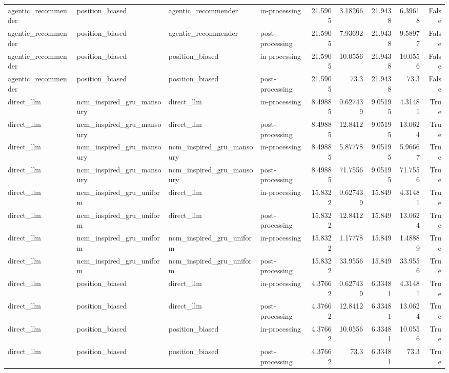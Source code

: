 \begin{table}[htbp!]
\begin{tabular}{llllrrrrr}
agentic\_recommender & position\_biased & agentic\_recommender & in-processing & 21.5905 & 3.18266 & 21.9438 & 6.39618 & False \\
agentic\_recommender & position\_biased & agentic\_recommender & post-processing & 21.5905 & 7.93692 & 21.9438 & 9.58977 & False \\
agentic\_recommender & position\_biased & position\_biased & in-processing & 21.5905 & 10.0556 & 21.9438 & 10.0556 & False \\
agentic\_recommender & position\_biased & position\_biased & post-processing & 21.5905 & 73.3 & 21.9438 & 73.3 & False \\
direct\_llm & ncm\_inspired\_gru\_mansoury & direct\_llm & in-processing & 8.49885 & 0.627439 & 9.05195 & 4.31481 & True \\
direct\_llm & ncm\_inspired\_gru\_mansoury & direct\_llm & post-processing & 8.49885 & 12.8412 & 9.05195 & 13.0624 & True \\
direct\_llm & ncm\_inspired\_gru\_mansoury & ncm\_inspired\_gru\_mansoury & in-processing & 8.49885 & 5.87778 & 9.05195 & 5.96667 & True \\
direct\_llm & ncm\_inspired\_gru\_mansoury & ncm\_inspired\_gru\_mansoury & post-processing & 8.49885 & 71.7556 & 9.05195 & 71.7556 & True \\
direct\_llm & ncm\_inspired\_gru\_uniform & direct\_llm & in-processing & 15.8322 & 0.627439 & 15.849 & 4.31481 & True \\
direct\_llm & ncm\_inspired\_gru\_uniform & direct\_llm & post-processing & 15.8322 & 12.8412 & 15.849 & 13.0624 & True \\
direct\_llm & ncm\_inspired\_gru\_uniform & ncm\_inspired\_gru\_uniform & in-processing & 15.8322 & 1.17778 & 15.849 & 1.48889 & True \\
direct\_llm & ncm\_inspired\_gru\_uniform & ncm\_inspired\_gru\_uniform & post-processing & 15.8322 & 33.9556 & 15.849 & 33.9556 & True \\
direct\_llm & position\_biased & direct\_llm & in-processing & 4.37662 & 0.627439 & 6.33481 & 4.31481 & True \\
direct\_llm & position\_biased & direct\_llm & post-processing & 4.37662 & 12.8412 & 6.33481 & 13.0624 & True \\
direct\_llm & position\_biased & position\_biased & in-processing & 4.37662 & 10.0556 & 6.33481 & 10.0556 & True \\
direct\_llm & position\_biased & position\_biased & post-processing & 4.37662 & 73.3 & 6.33481 & 73.3 & True \\

\end{tabular}
\end{table}
